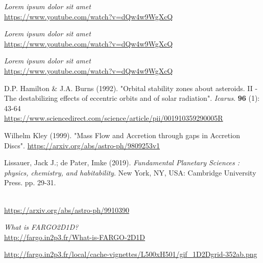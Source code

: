 
\begin{thebibliography}{00}

  \textit{Lorem ipsum dolor sit amet} \\
  \url{https://www.youtube.com/watch?v=dQw4w9WgXcQ}

  \textit{Lorem ipsum dolor sit amet} \\
  \url{https://www.youtube.com/watch?v=dQw4w9WgXcQ}

  \textit{Lorem ipsum dolor sit amet} \\
  \url{https://www.youtube.com/watch?v=dQw4w9WgXcQ}

  D.P. Hamilton \& J.A. Burns (1992). "Orbital stability zones about asteroids.
  II - The destabilizing effects of eccentric orbits and of solar radiation".
  \textit{Icarus}. \textbf{96} (1): 43-64 \\
  \url{https://www.sciencedirect.com/science/article/pii/001910359290005R}
  
   \red{!!!}
  Wilhelm Kley (1999). "Mass Flow and Accretion through gaps in Accretion Discs".
  \url{https://arxiv.org/abs/astro-ph/9809253v1}

  Lissauer, Jack J.; de Pater, Imke (2019). 
  \textit{Fundamental Planetary Sciences : physics, chemistry, and habitability}. 
  New York, NY, USA: Cambridge University Press. pp. 29-31.


  \textit{} \\
  \url{https://arxiv.org/abs/astro-ph/9910390}

  \textit{What is FARGO2D1D?} \\
  \url{http://fargo.in2p3.fr/What-is-FARGO-2D1D}
  

  \url{http://fargo.in2p3.fr/local/cache-vignettes/L500xH501/gif_1D2Dgrid-352ab.png}

\end{thebibliography}

